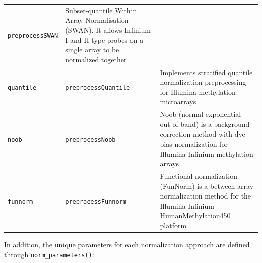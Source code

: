 \documentclass[
]{article}
\begin{document}
\begin{longtable}[]{@{}lll@{}}
\begin{minipage}[t]{0.23\columnwidth}
\texttt{preprocessSWAN}\strut
\end{minipage} & \begin{minipage}[t]{0.55\columnwidth}\raggedright
Subset-quantile Within Array Normalisation (SWAN). It allows Infinium I
and II type probes on a single array to be normalized together\strut
\end{minipage}\tabularnewline
\begin{minipage}[t]{0.12\columnwidth}\raggedright
\texttt{quantile}\strut
\end{minipage} & \begin{minipage}[t]{0.23\columnwidth}\raggedright
\texttt{preprocessQuantile}\strut
\end{minipage} & \begin{minipage}[t]{0.55\columnwidth}\raggedright
Implements stratified quantile normalization preprocessing for Illumina
methylation microarrays\strut
\end{minipage}\tabularnewline
\begin{minipage}[t]{0.12\columnwidth}\raggedright
\texttt{noob}\strut
\end{minipage} & \begin{minipage}[t]{0.23\columnwidth}\raggedright
\texttt{preprocessNoob}\strut
\end{minipage} & \begin{minipage}[t]{0.55\columnwidth}\raggedright
Noob (normal-exponential out-of-band) is a background correction method
with dye-bias normalization for Illumina Infinium methylation
arrays\strut
\end{minipage}\tabularnewline
\begin{minipage}[t]{0.12\columnwidth}\raggedright
\texttt{funnorm}\strut
\end{minipage} & \begin{minipage}[t]{0.23\columnwidth}\raggedright
\texttt{preprocessFunnorm}\strut
\end{minipage} & \begin{minipage}[t]{0.55\columnwidth}\raggedright
Functional normalization (FunNorm) is a between-array normalization
method for the Illumina Infinium HumanMethylation450 platform\strut
\end{minipage}\tabularnewline
\bottomrule
\end{longtable}

In addition, the unique parameters for each normalization approach are
defined through \texttt{norm\_parameters()}:
\end{document}
